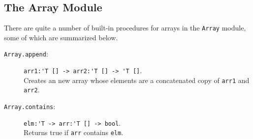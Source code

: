 \documentclass[springer.tex]{subfiles}
\begin{document}
\subsection{The Array Module}
There are quite a number of built-in procedures for arrays in the \lstinline{Array} module, some of which are summarized below.
\begin{description}
\item[\texttt{Array.append}:] \lstinline{arr1:'T [] -> arr2:'T [] -> 'T []}.~\\
  Creates an new array whose elements are a concatenated copy of \lstinline{arr1} and \lstinline{arr2}.
\item[\texttt{Array.contains}:] \lstinline{elm:'T -> arr:'T [] -> bool}.~\\
  Returns true if \lstinline{arr} contains \lstinline{elm}.

\end{description}
\end{document}
